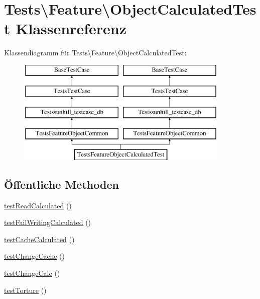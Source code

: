 \hypertarget{classTests_1_1Feature_1_1ObjectCalculatedTest}{}\section{Tests\textbackslash{}Feature\textbackslash{}Object\+Calculated\+Test Klassenreferenz}
\label{classTests_1_1Feature_1_1ObjectCalculatedTest}
Klassendiagramm für Tests\textbackslash{}Feature\textbackslash{}Object\+Calculated\+Test\+:\begin{figure}[H]
\begin{center}
\leavevmode
\includegraphics[height=5.000000cm]{d2/d14/classTests_1_1Feature_1_1ObjectCalculatedTest}
\end{center}
\end{figure}
\subsection*{Öffentliche Methoden}
\begin{DoxyCompactItemize}
\item 
\hyperlink{classTests_1_1Feature_1_1ObjectCalculatedTest_a08feb3b1589a452ebcadefbe4768ba6f}{test\+Read\+Calculated} ()
\item 
\hyperlink{classTests_1_1Feature_1_1ObjectCalculatedTest_ab143ac0e711a577909e3abd6bf43c3bb}{test\+Fail\+Writing\+Calculated} ()
\item 
\hyperlink{classTests_1_1Feature_1_1ObjectCalculatedTest_a9e34eba21cbe7883624ec0f4e47d9857}{test\+Cache\+Calculated} ()
\item 
\hyperlink{classTests_1_1Feature_1_1ObjectCalculatedTest_a9e0b6e3484c4da6f4b6e91888715c78d}{test\+Change\+Cache} ()
\item 
\hyperlink{classTests_1_1Feature_1_1ObjectCalculatedTest_a5201a06c551c6a6b410feb25d35ccf93}{test\+Change\+Calc} ()
\item 
\hyperlink{classTests_1_1Feature_1_1ObjectCalculatedTest_af165acadad5ef0f6b5d784f1e361fe42}{test\+Torture} ()
\end{DoxyCompactItemize}
